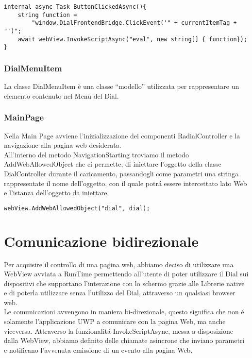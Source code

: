 \vspace{1.0cm}
\begin{lstlisting}[caption={Esempio Handler Eventi Dial},style=javaScriptCode]
internal async Task ButtonClickedAsync(){
	string function = 
		"window.DialFrontendBridge.ClickEvent('" + currentItemTag + "')";
    await webView.InvokeScriptAsync("eval", new string[] { function});
}
\end{lstlisting} 

\subsubsection{DialMenuItem}

La classe DialMenuItem è una classe “modello” utilizzata per rappresentare un elemento contenuto nel Menu del Dial.

\subsubsection{MainPage}

Nella Main Page avviene l’inizializzazione dei componenti RadialController e la navigazione alla pagina web desiderata.\\

All’interno del metodo NavigationStarting troviamo il metodo AddWebAllowedObject che ci permette, di iniettare l’oggetto della classe DialController durante il caricamento, passandogli come parametri una stringa rappresentate il nome dell'oggetto, con il quale potrá essere intercettato lato Web e l'istanza dell'oggetto da iniettare.

\begin{lstlisting}[caption={Injection oggetto C\#},style=javaScriptCode]
webView.AddWebAllowedObject("dial", dial);
\end{lstlisting}

\newpage
\section{Comunicazione bidirezionale}
Per acquisire il controllo di una pagina web, abbiamo deciso di utilizzare una WebView avviata a RunTime permettendo all'utente di poter utilizzare il Dial sui dispositivi che supportano l'interazione con lo schermo grazie alle Librerie native e di poterla utilizzare senza l'utilizzo del Dial, attraverso un qualsiasi browser web.\\
 
Le comunicazioni avvengono in maniera bi-direzionale, questo significa che non é solamente l'applicazione UWP a comunicare con la pagina Web, ma anche viceversa.
Attraverso la funzionalitá InvokeScriptAsync, messa a disposizione dalla WebView, abbiamo definito delle chiamate asincrone che inviano parametri e notificano l'avvenuta emissione di un evento alla pagina Web.\\


